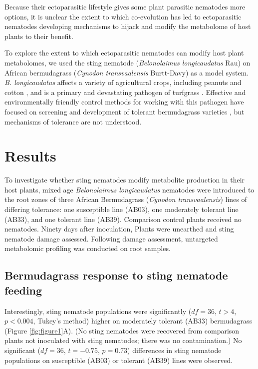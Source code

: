 \documentclass[9pt,lineno]{elife}
\begin{document}
Because their ectoparasitic lifestyle gives some plant parasitic nematodes more options, it is unclear the extent to which co-evolution has led to ectoparasitic nematodes developing mechanisms to hijack and modify the metabolome of host plants to their benefit.  

To explore the extent to which ectoparasitic nematodes can modify host plant metabolomes, we used the sting nematode (\textit{Belonolaimus longicaudatus} Rau) on African bermudagrass  (\textit{Cynodon transvaalensis} Burtt-Davy) as a model system.  \textit{B. longicaudatus} affects a variety of agricultural crops, including peanuts and cotton \citep{kutsuwa2015belonolaimus,crow2000yield}, and is a primary and devastating pathogen of turfgrass \citep{shaver2017damage, bekal2000population}.   Effective and environmentally friendly control methods for working with this pathogen have focused on screening and development of tolerant bermudagrass varieties \citep{pang2011bermudagrass,pang2011screening}, but mechanisms of tolerance are not understood. 

\section{Results}

To investigate whether sting nematodes modify metabolite production in their host plants, mixed age \textit{Belonolaimus longicaudatus} nematodes were introduced to the root zones of three African Bermudagrass (\textit{Cynodon transvaalensis}) lines of differing tolerance: one susceptible line (AB03), one moderately tolerant line (AB33), and one tolerant line (AB39).  Comparison control plants received no nematodes.  Ninety days after inoculation,  Plants were unearthed and sting nematode damage assessed.  Following damage assessment, untargeted metabolomic profiling was conducted on root samples.  

\subsection{Bermudagrass response to sting nematode feeding}
Interestingly, sting nematode populations were significantly ($df = 36$, $t > 4$, $p < 0.004$, Tukey's method) higher on moderately tolerant (AB33) bermudagrass (Figure \ref{fig:figure1}A).  (No sting nematodes were recovered from comparison plants not inoculated with sting nematodes; there was no contamination.)  No significant ($df = 36$, $t = -0.75$, $p = 0.73$) differences in sting nematode populations on susceptible (AB03) or tolerant (AB39) lines were observed.  
\end{document}
